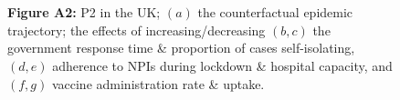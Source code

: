 \documentclass[paper=a4,fontsize=11pt]{article}
\begin{document}
\begin{figure}[!h]
  \\
  \hspace{1.76cm}
  \\
  \caption*{\textbf{Figure A2:} P2 in the UK; $(a)$ the counterfactual epidemic trajectory; the effects of increasing/decreasing $(b,c)$ the government response time \& proportion of cases self-isolating, $(d,e)$ adherence to NPIs during lockdown \& hospital capacity, and $(f,g)$ vaccine administration rate \& uptake.}
\end{figure}
\end{document}
